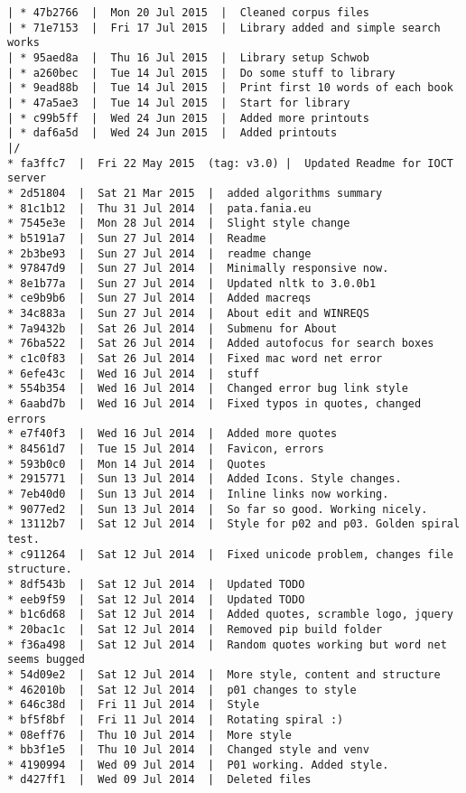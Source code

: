\begin{verbatim}
| * 47b2766  |  Mon 20 Jul 2015  |  Cleaned corpus files
| * 71e7153  |  Fri 17 Jul 2015  |  Library added and simple search works
| * 95aed8a  |  Thu 16 Jul 2015  |  Library setup Schwob
| * a260bec  |  Tue 14 Jul 2015  |  Do some stuff to library
| * 9ead88b  |  Tue 14 Jul 2015  |  Print first 10 words of each book
| * 47a5ae3  |  Tue 14 Jul 2015  |  Start for library
| * c99b5ff  |  Wed 24 Jun 2015  |  Added more printouts
| * daf6a5d  |  Wed 24 Jun 2015  |  Added printouts
|/  
* fa3ffc7  |  Fri 22 May 2015  (tag: v3.0) |  Updated Readme for IOCT server
* 2d51804  |  Sat 21 Mar 2015  |  added algorithms summary
* 81c1b12  |  Thu 31 Jul 2014  |  pata.fania.eu
* 7545e3e  |  Mon 28 Jul 2014  |  Slight style change
* b5191a7  |  Sun 27 Jul 2014  |  Readme
* 2b3be93  |  Sun 27 Jul 2014  |  readme change
* 97847d9  |  Sun 27 Jul 2014  |  Minimally responsive now.
* 8e1b77a  |  Sun 27 Jul 2014  |  Updated nltk to 3.0.0b1
* ce9b9b6  |  Sun 27 Jul 2014  |  Added macreqs
* 34c883a  |  Sun 27 Jul 2014  |  About edit and WINREQS
* 7a9432b  |  Sat 26 Jul 2014  |  Submenu for About
* 76ba522  |  Sat 26 Jul 2014  |  Added autofocus for search boxes
* c1c0f83  |  Sat 26 Jul 2014  |  Fixed mac word net error
* 6efe43c  |  Wed 16 Jul 2014  |  stuff
* 554b354  |  Wed 16 Jul 2014  |  Changed error bug link style
* 6aabd7b  |  Wed 16 Jul 2014  |  Fixed typos in quotes, changed errors
* e7f40f3  |  Wed 16 Jul 2014  |  Added more quotes
* 84561d7  |  Tue 15 Jul 2014  |  Favicon, errors
* 593b0c0  |  Mon 14 Jul 2014  |  Quotes
* 2915771  |  Sun 13 Jul 2014  |  Added Icons. Style changes.
* 7eb40d0  |  Sun 13 Jul 2014  |  Inline links now working.
* 9077ed2  |  Sun 13 Jul 2014  |  So far so good. Working nicely.
* 13112b7  |  Sat 12 Jul 2014  |  Style for p02 and p03. Golden spiral test.
* c911264  |  Sat 12 Jul 2014  |  Fixed unicode problem, changes file structure.
* 8df543b  |  Sat 12 Jul 2014  |  Updated TODO
* eeb9f59  |  Sat 12 Jul 2014  |  Updated TODO
* b1c6d68  |  Sat 12 Jul 2014  |  Added quotes, scramble logo, jquery
* 20bac1c  |  Sat 12 Jul 2014  |  Removed pip build folder
* f36a498  |  Sat 12 Jul 2014  |  Random quotes working but word net seems bugged
* 54d09e2  |  Sat 12 Jul 2014  |  More style, content and structure
* 462010b  |  Sat 12 Jul 2014  |  p01 changes to style
* 646c38d  |  Fri 11 Jul 2014  |  Style
* bf5f8bf  |  Fri 11 Jul 2014  |  Rotating spiral :)
* 08eff76  |  Thu 10 Jul 2014  |  More style
* bb3f1e5  |  Thu 10 Jul 2014  |  Changed style and venv
* 4190994  |  Wed 09 Jul 2014  |  P01 working. Added style.
* d427ff1  |  Wed 09 Jul 2014  |  Deleted files

\end{verbatim}
